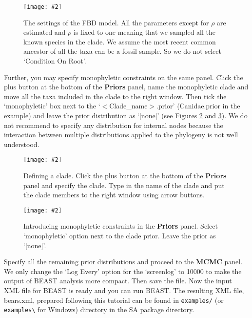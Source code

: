 \documentclass[12pt]{article}
\newcommand{\includeimage}[2][]{%
\texttt{[image: \#2]}
}
\begin{document}
\begin{figure}	
\centering
\includeimage[width=\textwidth]{figures/FBDsettings}
\caption{The settings of the FBD model. All the parameters except for $\rho$ are estimated and $\rho$ is fixed to one meaning that we sampled all the known species in the clade. We assume the most recent common ancestor of all the taxa can be a fossil sample. So we do not select `Condition On Root'. \label{fig:FBDsettings}}
\end{figure}

Further, you may specify monophyletic constraints on the same panel. Click the plus button at the bottom of the {\bf Priors} panel, name the monophyletic clade and move all the taxa included in the clade to the right window. Then tick the `monophyletic' box next to the `$<$Clade\_name$>$.prior' (Canidae.prior in the example) and leave the prior distribution as `[none]' (see Figures \ref{fig:MonophyleticClade} and \ref{fig:MonophyleticConstraint}). We do not recommend to specify any distribution for internal nodes because the interaction between multiple distributions applied to the phylogeny is not well understood.
 
\begin{figure}	
\centering
\includeimage[width=\textwidth]{figures/MonophyleticClade}
\caption{Defining a clade. Click the plus button at the bottom of the {\bf Priors} panel and specify the clade. Type in the name of the clade and put the clade members to the right window using arrow buttons. \label{fig:MonophyleticClade}}
\end{figure}

\begin{figure}	
\centering
\includeimage[width=\textwidth]{figures/MonophyleticConstraint}
\caption{Introducing monophyletic constraints in the {\bf Priors} panel. Select `monophyletic' option next to the clade prior. Leave the prior as `[none]'. \label{fig:MonophyleticConstraint}}
\end{figure}

Specify all the remaining prior distributions and proceed to the {\bf MCMC} panel. We only change the `Log Every' option for the `screenlog' to 10000 to make the output of BEAST analysis more compact. Then save the file. Now the input XML file for BEAST is ready and you can run BEAST. The resulting XML file, bears.xml, prepared following this tutorial can be found in {\tt examples/} (or {\tt examples\textbackslash} for Windows) directory in the SA package directory. 
\end{document}
